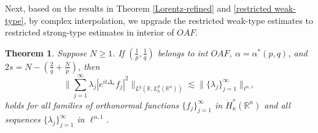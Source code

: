 \documentclass[a4paper,11pt, reqno]{amsart}
\numberwithin{equation}{section}
\theoremstyle{plain}
\newtheorem{theorem}{Theorem}[section]
\theoremstyle{definition}
\theoremstyle{remark}
\begin{document}
Next, based on the results in Theorem \ref{Lorentz-refined} and \ref{restricted weak-type}, by complex interpolation, we upgrade the restricted weak-type estimates to restricted strong-type estimates in interior of $OAF$.
\begin{theorem}\label{restricted strong-type}
   Suppose $N\geq1$. If $(\frac{1}{p},\frac{1}{q})$ belongs to int $OAF$, $\alpha=\alpha^*(p,q)$, and $2s=N-\left(\frac{2}{q}+\frac{N}{p}\right)$, then
\begin{equation*}
			\bigg\|\sum_{j=1}^\infty \lambda_j|e^{it\Delta_\kappa}f_j|^2\bigg\|_{L^{q}(\mathbb{R}, L_\kappa^p(\mathbb{R}^n))}\lesssim \|\{\lambda_j\}^\infty_{j=1}\|_{\ell^{\alpha,1}} 
\end{equation*}	
  holds for all families of orthonormal functions $\{f_j\}_{j=1}^\infty$ in $\dot{H}_\kappa^s(\mathbb{R}^n)$ and all sequences $\{\lambda_j\}^\infty_{j=1}$ in $\ell^{\alpha,1}$. 
\end{theorem}
\end{document}
